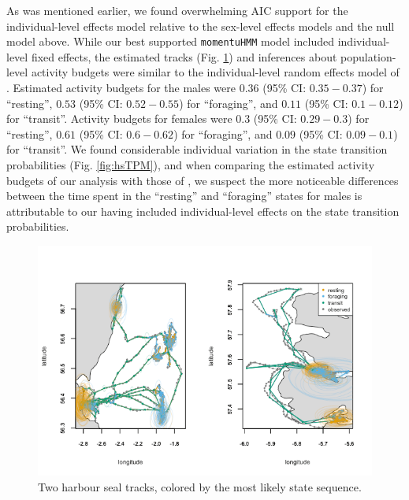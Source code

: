 \documentclass[12pt]{article}\usepackage[]{graphicx}\usepackage[]{xcolor}
\begin{document}
As was mentioned earlier, we found overwhelming AIC support for the individual-level effects model relative to the sex-level effects models and the null model above. While our best supported \verb|momentuHMM| model included individual-level fixed effects, the estimated tracks (Fig. \ref{fig:hsTracks}) and inferences about population-level activity budgets were similar to the individual-level random effects model of \cite{McClintockEtAl2013c}. Estimated activity budgets for the males were $0.36$ (95\% CI: $0.35-0.37$) for ``resting'', $0.53$ (95\% CI: $0.52-0.55$) for ``foraging'', and $0.11$ (95\% CI: $0.1-0.12$) for ``transit''.  Activity budgets for females were $0.3$ (95\% CI: $0.29-0.3$) for ``resting'', $0.61$ (95\% CI: $0.6-0.62$) for ``foraging'', and $0.09$ (95\% CI: $0.09-0.1$) for ``transit''. We found considerable individual variation in the state transition probabilities (Fig. \ref{fig:hsTPM}), and when comparing the estimated activity budgets of our analysis with those of \cite{McClintockEtAl2013c}, we suspect the more noticeable differences between the time spent in the ``resting'' and ``foraging'' states for males is attributable to our having included individual-level effects on the state transition probabilities.  
\begin{figure}[htbp]
  \centering
  \includegraphics[width=\textwidth]{plot_harbourSeal.png}
  \caption{Two harbour seal tracks, colored by the most likely state sequence.}
  \label{fig:hsTracks}
\end{figure}
\end{document}
